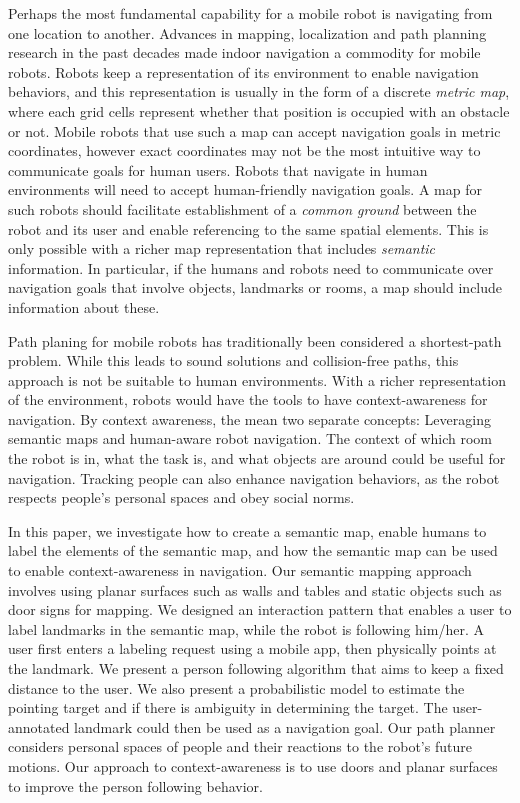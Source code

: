 \documentclass{tADR2e}
\begin{document}
Perhaps the most fundamental capability for a mobile robot is navigating from one location to another. Advances in mapping, localization and path planning research in the past decades made indoor navigation a commodity for mobile robots. Robots keep a representation of its environment to enable navigation behaviors, and this representation is usually in the form of a discrete \textit{metric map}, where each grid cells represent whether that position is occupied with an obstacle or not. Mobile robots that use such a map can accept navigation goals in metric coordinates, however exact coordinates may not be the most intuitive way to communicate goals for human users. Robots that navigate in human environments will need to accept human-friendly navigation goals. A map for such robots should facilitate establishment of a \textit{common ground} between the robot and its user and enable referencing to the same spatial elements. This is only possible with a richer map representation that includes \textit{semantic} information. In particular, if the humans and robots need to communicate over navigation goals that involve objects, landmarks or rooms, a map should include information about these.

Path planing for mobile robots has traditionally been considered a shortest-path problem. While this leads to sound solutions and collision-free paths, this approach is not be suitable to human environments. With a richer representation of the environment, robots would have the tools to have context-awareness for navigation. By context awareness, the mean two separate concepts: Leveraging semantic maps and human-aware robot navigation. The context of which room the robot is in, what the task is, and what objects are around could be useful for navigation. Tracking people can also enhance navigation behaviors, as the robot respects people's personal spaces and obey social norms.

In this paper, we investigate how to create a semantic map, enable humans to label the elements of the semantic map, and how the semantic map can be used to enable context-awareness in navigation. Our semantic mapping approach involves using planar surfaces such as walls and tables and static objects such as door signs for mapping. We designed an interaction pattern that enables a user to label landmarks in the semantic map, while the robot is following him/her. A user first enters a labeling request using a mobile app, then physically points at the landmark. We present a person following algorithm that aims to keep a fixed distance to the user. We also present a probabilistic model to estimate the pointing target and if there is ambiguity in determining the target. The user-annotated landmark could then be used as a navigation goal. Our path planner considers personal spaces of people and their reactions to the robot's future motions. Our approach to context-awareness is to use doors and planar surfaces to improve the person following behavior.
\end{document}
